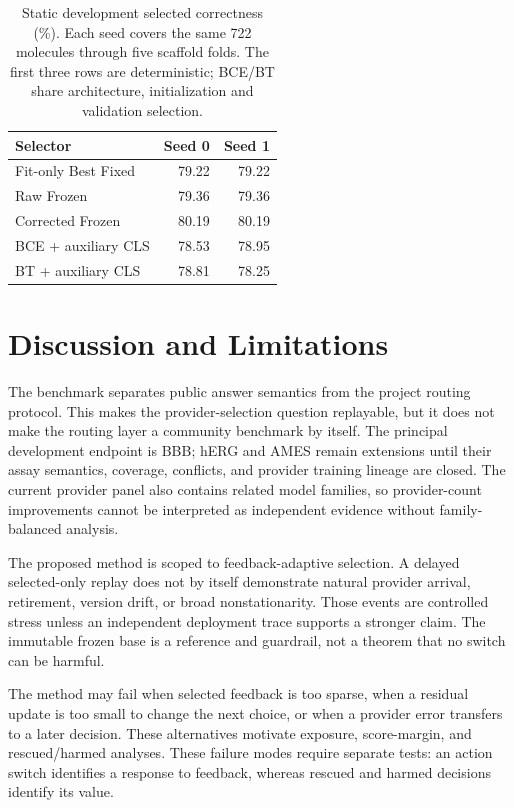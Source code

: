 \documentclass[sigconf,anonymous]{aamas}
\begin{document}
\begin{table}[t]
\caption{Static development selected correctness (\%). Each seed covers the same 722 molecules through five scaffold folds. The first three rows are deterministic; BCE/BT share architecture, initialization and validation selection.}
\label{tab:learned-prior}
\centering
\small
\begin{tabular}{@{}lrr@{}}
\toprule
Selector & Seed 0 & Seed 1 \\
\midrule
Fit-only Best Fixed & 79.22 & 79.22 \\
Raw Frozen & 79.36 & 79.36 \\
Corrected Frozen & 80.19 & 80.19 \\
BCE + auxiliary CLS & 78.53 & 78.95 \\
BT + auxiliary CLS & 78.81 & 78.25 \\
\bottomrule
\end{tabular}
\end{table}

\section{Discussion and Limitations}
The benchmark separates public answer semantics from the project routing protocol. This makes the provider-selection question replayable, but it does not make the routing layer a community benchmark by itself. The principal development endpoint is BBB; hERG and AMES remain extensions until their assay semantics, coverage, conflicts, and provider training lineage are closed. The current provider panel also contains related model families, so provider-count improvements cannot be interpreted as independent evidence without family-balanced analysis.

The proposed method is scoped to feedback-adaptive selection. A delayed selected-only replay does not by itself demonstrate natural provider arrival, retirement, version drift, or broad nonstationarity. Those events are controlled stress unless an independent deployment trace supports a stronger claim. The immutable frozen base is a reference and guardrail, not a theorem that no switch can be harmful.

The method may fail when selected feedback is too sparse, when a residual update is too small to change the next choice, or when a provider error transfers to a later decision. These alternatives motivate exposure, score-margin, and rescued/harmed analyses. These failure modes require separate tests: an action switch identifies a response to feedback, whereas rescued and harmed decisions identify its value.
\end{document}
